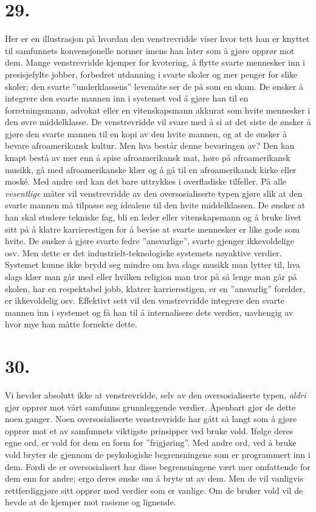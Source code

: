 \documentclass[oneside]{book}
\begin{document}
\section*{29.}
Her er en illustrasjon på hvordan den venstrevridde viser hvor tett han er knyttet til samfunnets konvensjonelle normer imens han later som å gjøre opprør mot dem. Mange venstrevridde kjemper for kvotering, å flytte svarte mennesker inn i presisjefylte jobber, forbedret utdanning i svarte skoler og mer penger for slike skoler; den svarte ''underklassens'' levemåte ser de på som en skam. De ønsker å integrere den svarte mannen inn i systemet ved å gjøre han til en forretningsmann, advokat eller en vitenskapsmann akkurat som hvite mennesker i den øvre middelklasse. De venstrevridde vil svare med å si at det siste de ønsker å gjøre den svarte mannen til en kopi av den hvite mannen, og at de ønsker å bevare afroamerikansk kultur. Men hva består denne bevaringen av? Den kan knapt bestå av mer enn å spise afroamerikansk mat, høre på afroamerikansk musikk, gå med afroamerikanske klær og å gå til en afroamerikansk kirke eller moské. Med andre ord kan det bare uttrykkes i overfladiske tilfeller. På alle {\em vesentlige} måter vil venstrevridde av den oversosialiserte typen gjøre slik at den svarte mannen må tilpasse seg idealene til den hvite middelklassen. De ønsker at han skal studere tekniske fag, bli en leder eller vitenskapsmann og å bruke livet sitt på å klatre karrierestigen for å bevise at svarte mennesker er like gode som hvite. De ønsker å gjøre svarte fedre ''ansvarlige'', svarte gjenger ikkevoldelige osv. Men dette er det industrielt-teknologiske systemets nøyaktive verdier. Systemet kunne ikke brydd seg mindre om hva slags musikk man lytter til, hva slags klær man går med eller hvilken religion man tror på så lenge man går på skolen, har en respektabel jobb, klatrer karrierestigen, er en ''ansvarlig'' forelder, er ikkevoldelig osv. Effektivt sett vil den venstrevridde integrere den svarte mannen inn i systemet og få han til å internalisere dets verdier, uavhengig av hvor mye han måtte fornekte dette.

\section*{30.}
Vi hevder absolutt ikke at venstrevridde, selv av den oversosialiserte typen, {\em aldri} gjør opprør mot vårt samfunns grunnleggende verdier. Åpenbart gjør de dette noen ganger. Noen oversosialiserte venstrevridde har gått så langt som å gjøre opprør mot et av samfunnets viktigste prinsipper ved bruke vold. Ifølge deres egne ord, er vold for dem en form for ''frigjøring''. Med andre ord, ved å bruke vold bryter de gjennom de psykologiske begrensningene som er programmert inn i dem. Fordi de er oversosialisert har disse begrensningene vært mer omfattende for dem enn for andre; ergo deres ønske om å bryte ut av dem. Men de vil vanligvis rettferdiggjøre sitt opprør med verdier som er vanlige. Om de bruker vold vil de hevde at de kjemper mot rasisme og lignende.
\end{document}
